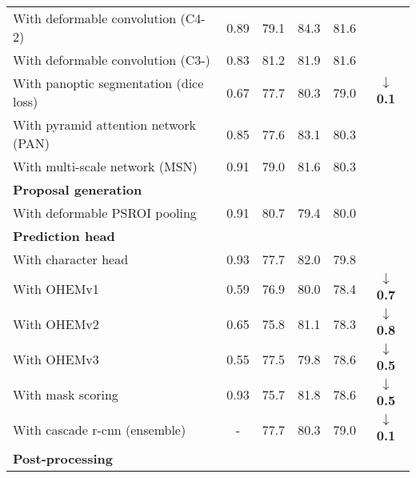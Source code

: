 \begin{table*}
\begin{tabular}{lccccc}
  \hspace{5mm} With deformable convolution (C4-2) & 0.89 & 79.1 & 84.3 & 81.6 & \bf \color{red}{$\uparrow$ 2.5} \\
  \hspace{5mm} With deformable convolution (C3-) & 0.83 & 81.2 & 81.9 & 81.6 & \bf \color{red}{$\uparrow$ 2.5} \\
  \hspace{5mm} With panoptic segmentation (dice loss) & 0.67 & 77.7 & 80.3 & 79.0 &  \bf \textcolor[RGB]{0,160,0}{$\downarrow$ 0.1} \\
  \hspace{5mm} With pyramid attention network (PAN) & 0.85 & 77.6 & 83.1 & 80.3 & \bf \color{red}{$\uparrow$ 1.2} \\
  \hspace{5mm} With multi-scale network (MSN) & 0.91 & 79.0 & 81.6 & 80.3 & \bf \color{red}{$\uparrow$ 1.2} \\
  \noalign{\smallskip}\hline
  {\bf Proposal generation} \\
  \hspace{5mm} With deformable PSROI pooling & 0.91 & 80.7 & 79.4 & 80.0 &  \bf \color{red}{$\uparrow$ 0.9} \\
  \noalign{\smallskip}\hline
  {\bf Prediction head} \\
  \hspace{5mm} With character head & 0.93 & 77.7 & 82.0 & 79.8 &  \bf \color{red}{$\uparrow$ 0.7} \\
  \hspace{5mm} With OHEMv1 & 0.59 & 76.9 & 80.0 & 78.4 &  \bf \textcolor[RGB]{0,160,0}{$\downarrow$ 0.7} \\
  \hspace{5mm} With OHEMv2 & 0.65 & 75.8 & 81.1 & 78.3 &  \bf \textcolor[RGB]{0,160,0}{$\downarrow$ 0.8} \\
  \hspace{5mm} With OHEMv3 & 0.55 & 77.5 & 79.8 & 78.6 &  \bf \textcolor[RGB]{0,160,0}{$\downarrow$ 0.5} \\
  \hspace{5mm} With mask scoring & 0.93 & 75.7 & 81.8 & 78.6 &  \bf \textcolor[RGB]{0,160,0}{$\downarrow$ 0.5} \\
\hspace{5mm} With cascade r-cnn (ensemble) & - & 77.7 & 80.3 & 79.0 &  \bf \textcolor[RGB]{0,160,0}{$\downarrow$ 0.1} \\
  \noalign{\smallskip}\hline
  {\bf Post-processing} \\

\end{tabular}
\end{table*}
